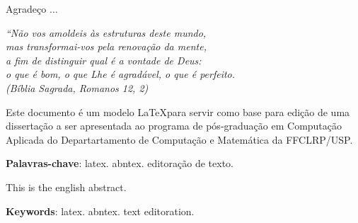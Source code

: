 \documentclass[
12pt,        %
openright,   %
twoside,     %
a4paper,     %
english,       %
brazil,        %
%
%
]{ppgca}
\begin{document}
\begin{agradecimentos}
Agradeço $\ldots$
\end{agradecimentos}

\begin{epigrafe}
    \vspace*{\fill}
	\begin{flushright}
		\textit{``Não vos amoldeis às estruturas deste mundo, \\
		mas transformai-vos pela renovação da mente, \\
		a fim de distinguir qual é a vontade de Deus: \\
		o que é bom, o que Lhe é agradável, o que é perfeito.\\
		(Bíblia Sagrada, Romanos 12, 2)}
	\end{flushright}
\end{epigrafe}


\setlength{\absparsep}{18pt} %
\begin{resumo}
  Este documento é um modelo \LaTeX para servir como base para edição
  de uma dissertação a ser apresentada ao programa de pós-graduação em
  Computação Aplicada do Departartamento de Computação e Matemática da
  FFCLRP/USP.

\noindent \textbf{Palavras-chave}: latex. abntex. editoração de texto.
\end{resumo}

\begin{resumo}[Abstract]
   This is the english abstract.

   \vspace{\onelineskip}
 
   \noindent \textbf{Keywords}: latex. abntex. text editoration.
\end{resumo}


\listoffigures*
\cleardoublepage

\end{document}
